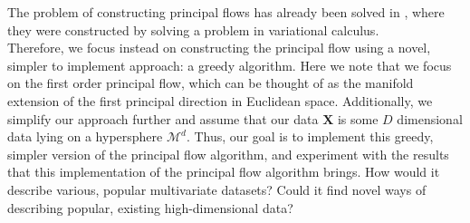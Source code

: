 \documentclass[12pt]{report}
\begin{document}
The problem of constructing principal flows 
has already been solved in \cite{principalflow}, 
where they were constructed by 
solving a problem in variational calculus. \\
Therefore, we focus instead on constructing the principal flow using a novel, 
simpler to implement approach: a greedy algorithm. 
Here we note that we focus on 
the first order principal flow, which can be thought of as 
the manifold extension of the first principal direction in Euclidean space.
Additionally, we simplify our approach further and 
assume that our data $\mathbf{X}$ is some $D$ dimensional
data lying on a hypersphere $\mathcal{M}^d$.
Thus, our goal is to implement this greedy, simpler version of the
principal flow algorithm, 
and experiment with the results that this implementation of the
principal flow algorithm brings. 
How would it describe various, popular multivariate
datasets? Could it find novel ways of describing popular,
existing high-dimensional data?
\end{document}

